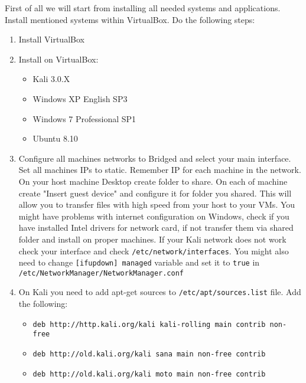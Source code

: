 \documentclass{article}[12pt]
\begin{document}
First of all we will start from installing all needed systems and applications.
Install mentioned systems within VirtualBox.
Do the following steps:
\begin{enumerate}
\item{Install VirtualBox}
\item{Install on VirtualBox:}
\begin{itemize}
\item{Kali 3.0.X}
\item{Windows XP English SP3}
\item{Windows 7 Professional SP1}
\item{Ubuntu 8.10}
\end{itemize}
\item{Configure all machines networks to Bridged and select your main interface. Set all machines IPs to static. Remember IP for each machine in the network.
On your host machine Desktop create folder to share. On each of machine create "Insert guest device" and configure it for folder you shared. This will allow you to transfer files with high speed from your host
to your VMs. You might have problems with internet configuration on Windows, check if you have installed Intel drivers for network card, if not transfer them via shared folder and install on proper machines. If your Kali network does not work check your interface and check
\texttt{/etc/network/interfaces}. You might also need to change \texttt{[ifupdown] managed} variable and set it to \texttt{true} in \texttt{/etc/NetworkManager/NetworkManager.conf}}

\item{On Kali you need to add apt-get sources to \texttt{/etc/apt/sources.list} file. Add the following:

\begin{itemize}
\item{\texttt{deb http://http.kali.org/kali kali-rolling main contrib non-free}}
\item{\texttt{deb http://old.kali.org/kali sana main non-free contrib}}
\item{\texttt{deb http://old.kali.org/kali moto main non-free contrib}}
\end{itemize}

}
\end{enumerate}
\end{document}
